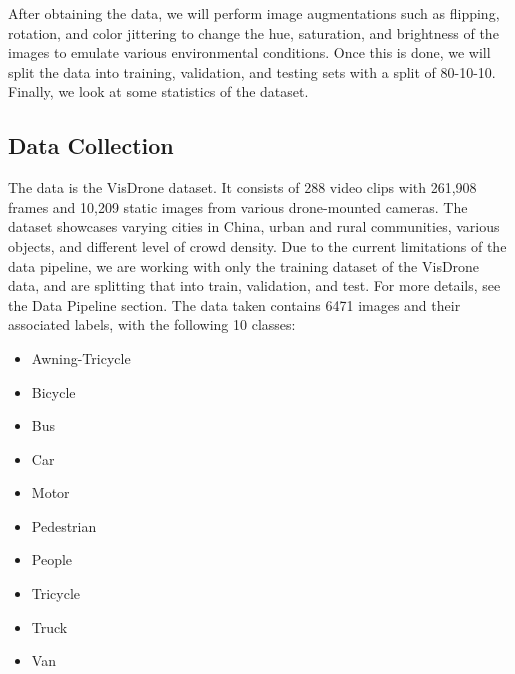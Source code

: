 \documentclass[stu,12pt,floatsintext]{apa7}
\begin{document}
After obtaining the data, we will perform image augmentations such as flipping, rotation, and color jittering to change the hue, saturation, and brightness of the images to emulate various environmental conditions. Once this is done, we will split the data into training, validation, and testing sets with a split of 80-10-10. Finally, we look at some statistics of the dataset.

\subsection{Data Collection}
The data is the VisDrone dataset. It consists of 288 video clips with 261,908 frames and 10,209 static images from various drone-mounted cameras. The dataset showcases varying cities in China, urban and rural communities, various objects, and different level of crowd density. Due to the current limitations of the data pipeline, we are working with only the training dataset of the VisDrone data, and are splitting that into train, validation, and test. For more details, see the Data Pipeline section.
The data taken contains 6471 images and their associated labels, with the following 10 classes:
\begin{itemize}
	\item Awning-Tricycle
	\item Bicycle
	\item Bus
	\item Car
	\item Motor
	\item Pedestrian
	\item People
	\item Tricycle
	\item Truck
	\item Van
\end{itemize}

\end{document}
